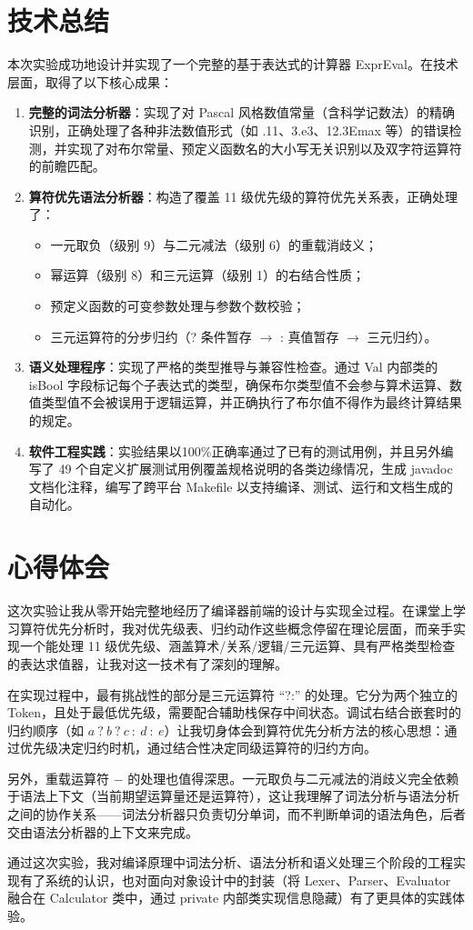 \section{技术总结}
本次实验成功地设计并实现了一个完整的基于表达式的计算器 ExprEval。在技术层面，取得了以下核心成果：

\begin{enumerate}
    \item \textbf{完整的词法分析器}：实现了对 Pascal 风格数值常量（含科学记数法）的精确识别，正确处理了各种非法数值形式（如 .11、3.e3、12.3Emax 等）的错误检测，并实现了对布尔常量、预定义函数名的大小写无关识别以及双字符运算符的前瞻匹配。

    \item \textbf{算符优先语法分析器}：构造了覆盖 11 级优先级的算符优先关系表，正确处理了：
    \begin{itemize}
        \item 一元取负（级别 9）与二元减法（级别 6）的重载消歧义；
        \item 幂运算（级别 8）和三元运算（级别 1）的右结合性质；
        \item 预定义函数的可变参数处理与参数个数校验；
        \item 三元运算符的分步归约（? 条件暂存 $\rightarrow$ : 真值暂存 $\rightarrow$ 三元归约）。
    \end{itemize}

    \item \textbf{语义处理程序}：实现了严格的类型推导与兼容性检查。通过 Val 内部类的 isBool 字段标记每个子表达式的类型，确保布尔类型值不会参与算术运算、数值类型值不会被误用于逻辑运算，并正确执行了布尔值不得作为最终计算结果的规定。

    \item \textbf{软件工程实践}：实验结果以100\%正确率通过了已有的测试用例，并且另外编写了 49 个自定义扩展测试用例覆盖规格说明的各类边缘情况，生成 javadoc 文档化注释，编写了跨平台 Makefile 以支持编译、测试、运行和文档生成的自动化。
\end{enumerate}

\section{心得体会}
这次实验让我从零开始完整地经历了编译器前端的设计与实现全过程。在课堂上学习算符优先分析时，我对优先级表、归约动作这些概念停留在理论层面，而亲手实现一个能处理 11 级优先级、涵盖算术/关系/逻辑/三元运算、具有严格类型检查的表达求值器，让我对这一技术有了深刻的理解。

在实现过程中，最有挑战性的部分是三元运算符 ``?:'' 的处理。它分为两个独立的 Token，且处于最低优先级，需要配合辅助栈保存中间状态。调试右结合嵌套时的归约顺序（如 $a\ ?\ b\ ?\ c\ :\ d\ :\ e$）让我切身体会到算符优先分析方法的核心思想：通过优先级决定归约时机，通过结合性决定同级运算符的归约方向。

另外，重载运算符 $-$ 的处理也值得深思。一元取负与二元减法的消歧义完全依赖于语法上下文（当前期望运算量还是运算符），这让我理解了词法分析与语法分析之间的协作关系——词法分析器只负责切分单词，而不判断单词的语法角色，后者交由语法分析器的上下文来完成。

通过这次实验，我对编译原理中词法分析、语法分析和语义处理三个阶段的工程实现有了系统的认识，也对面向对象设计中的封装（将 Lexer、Parser、Evaluator 融合在 Calculator 类中，通过 private 内部类实现信息隐藏）有了更具体的实践体验。
